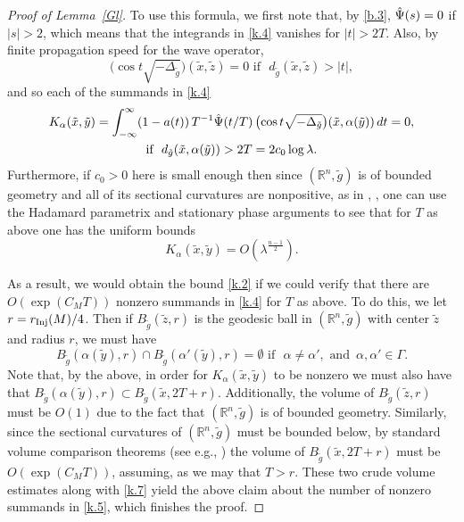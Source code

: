 \documentclass[10pt]{amsart}
\newcommand{\Rn}{{\mathbb R}^n}
\newcommand{\la}{\lambda}
\newcommand{\Inj}{r_{\rm{Inj}}}
\newcommand{\1}{{\bf 1}}
\newcommand{\tidle}{\tilde}
\begin{document}
\begin{proof}[Proof of Lemma~\ref{Gl}]
To use this formula, we first note that, by \eqref{b.3},
$\Hat \Psi(s)=0$ if $|s|>2$, which means that the integrands in \eqref{k.4} vanishes for $|t|>2T$.  Also, by finite propagation
speed for the wave operator,
$$\bigl(\cos t\sqrt{-\Delta_{\tilde g}}\bigr)(\tilde x,\tilde z)=0 \, \, \text{if } \, \,
d_{\tilde g}(\tilde x,\tilde z)>|t|,$$
and so each of the summands in \eqref{k.4}
\begin{multline}\label{k.5}
K_\alpha (\tilde x,\tilde y)=\int_{-\infty}^\infty (1-a(t)) \, T^{-1}\Hat \Psi(t/T)
\,  \bigl(\cos t\sqrt{-\Delta_{\tilde g}}\bigr)(\tilde x,\alpha (\tilde y))\, dt =0,
\\
\text{if } \, \, d_{\tilde g}(\tilde x,\alpha(\tilde y))>2T=2c_0\log\la.
\end{multline}
Furthermore, if $c_0>0$ here is small enough then since $(\Rn,\tilde g)$ is of bounded geometry and all of its
sectional curvatures are nonpositive, as in \cite{Berard}, \cite[\S 3.6]{SoggeHangzhou}, one can use the
Hadamard parametrix
and stationary phase arguments to see that for $T$ as above one has the uniform bounds
\begin{equation}\label{k.6}
K_\alpha(\tilde x,\tilde y)=O(\la^{\frac{n-1}2}).
\end{equation}


As a result, we would obtain the bound \eqref{k.2} if we could verify that there are $O(\exp(C_MT))$ nonzero summands
in \eqref{k.4} for $T$ as above.  To do this, we let $r=\Inj (M)/4$.  Then if $B_{\tilde g}(\tilde z,r)$ is the geodesic ball
in $(\Rn,\tilde g)$ with center $\tidle z$ and radius $r$, we must have
\begin{equation}\label{k.7}
B_{\tilde g}(\alpha(\tilde y),r) \cap B_{\tilde g}(\alpha'(\tilde y),r)=\emptyset
\, \, \text{if } \, \, \alpha\ne \alpha', \, \,
\text{and } \, \alpha,\alpha'\in \Gamma.
\end{equation}
 Note that, by the above, in order for $K_\alpha(\tilde x,\tilde y)$ to be nonzero
we must also have that $B_{\tilde g}(\alpha(\tilde y),r)\subset B_{\tilde g}(\tilde x,2T+r)$.
Additionally, the volume of $B_{\tilde g}(\tilde z,r)$ must be $O(1)$ due to the fact that $(\Rn,\tilde g)$ is
of bounded geometry.  Similarly, since the sectional curvatures of $(\Rn,\tilde g)$ must be bounded below,
by standard volume comparison theorems (see e.g., \cite{ChavelRiemannianGeometry}) the volume of
$B_{\tilde g}(\tilde x,2T+r)$ must be $O(\exp(C_MT))$, assuming, as we may that $T>r$.  These two crude
volume estimates along with \eqref{k.7} yield the above claim about the number of nonzero summands
in \eqref{k.5}, which finishes the proof.
\end{proof}
\end{document}
